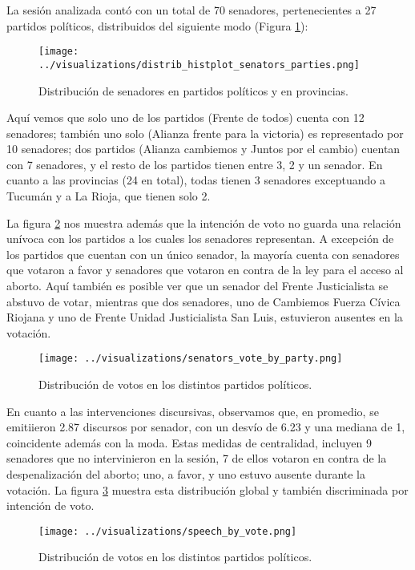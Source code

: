 La sesión analizada contó con un total de 70 senadores,
pertenecientes a 27 partidos políticos, distribuidos del
siguiente modo (Figura \ref{fig-distrib-senators}):

\begin{figure}[h!]
\centering
\texttt{[image: ../visualizations/distrib\_histplot\_senators\_parties.png]}
\caption{Distribución de senadores en partidos políticos y en provincias.}
\label{fig-distrib-senators}
\end{figure}

Aquí vemos que solo uno de los partidos (Frente de todos) cuenta con 12
senadores; también uno solo (Alianza frente para la victoria) es
representado por 10 senadores; dos partidos (Alianza cambiemos y
Juntos por el cambio) cuentan con 7 senadores, y el resto de los
partidos tienen entre 3, 2 y un senador.
En cuanto a las provincias (24 en total), todas tienen 3 senadores
exceptuando a Tucumán y a La Rioja, que tienen solo 2.

La figura \ref{fig-distrib-vote} nos muestra además que la intención
de voto no guarda una relación unívoca con los partidos a los cuales los
senadores representan. A excepción de los partidos que cuentan con un único
senador, la mayoría cuenta con senadores que votaron a favor y senadores
que votaron en contra de la ley para el acceso al aborto. Aquí también
es posible ver que un senador del Frente Justicialista se abstuvo de votar,
mientras que dos senadores, uno de Cambiemos Fuerza Cívica Riojana y uno de
Frente Unidad Justicialista San Luis, estuvieron ausentes en la votación.

\begin{figure}[h!]
\centering
\texttt{[image: ../visualizations/senators\_vote\_by\_party.png]}
\caption{Distribución de votos en los distintos partidos políticos.}
\label{fig-distrib-vote}
\end{figure}

En cuanto a las intervenciones discursivas, observamos que, en promedio, se emitiieron
2.87 discursos por senador, con un desvío de 6.23 y una mediana de 1, coincidente además
con la moda. Estas medidas de centralidad, incluyen 9 senadores que no intervinieron en
la sesión, 7 de ellos votaron en contra de la despenalización del aborto; uno, a favor,
y uno estuvo ausente durante la votación. La figura \ref{fig-distrib-speech} muestra esta
distribución global y también discriminada por intención de voto.

\begin{figure}[h!]
    \centering
    \texttt{[image: ../visualizations/speech\_by\_vote.png]}
    \caption{Distribución de votos en los distintos partidos políticos.}
    \label{fig-distrib-speech}
\end{figure}

